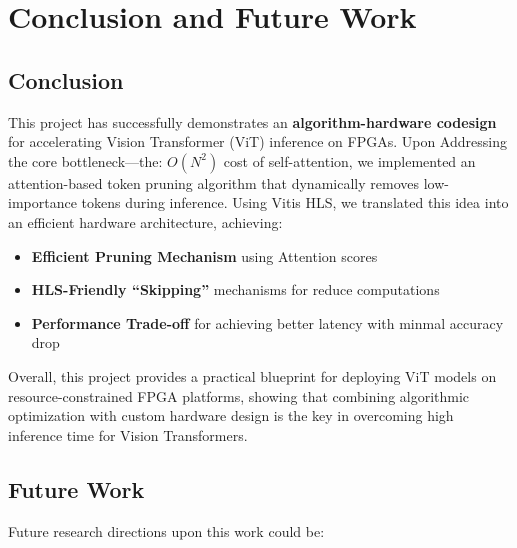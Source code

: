 \chapter{Conclusion and Future Work}

\section{Conclusion}
This project has successfully demonstrates an \textbf{algorithm-hardware codesign} for accelerating Vision Transformer (ViT) inference on FPGAs. Upon Addressing the core bottleneck—the: $O(N^2)$ cost of self-attention, we implemented an attention-based token pruning algorithm that dynamically removes low-importance tokens during inference.
Using Vitis HLS, we translated this idea into an efficient hardware architecture, achieving:
\begin{itemize}
    \item \textbf{Efficient Pruning Mechanism} using Attention scores
    \item \textbf{HLS-Friendly ``Skipping''} mechanisms for reduce computations
    \item \textbf{Performance Trade-off} for achieving better latency with minmal accuracy drop
\end{itemize}
Overall, this project provides a practical blueprint for deploying ViT models on resource-constrained FPGA platforms, showing that combining algorithmic optimization with custom hardware design is the key in overcoming high inference time for Vision Transformers.

\section{Future Work}
Future research directions upon this work could be:

